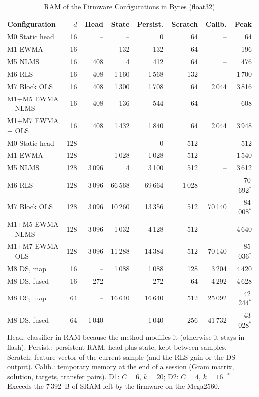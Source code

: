 \begin{table}[t]
\caption{RAM of the Firmware Configurations in Bytes (float32)}
\label{tab:ram}\centering\scriptsize\setlength{\tabcolsep}{2pt}
\begin{tabular}{l r r r r r r r}\toprule
Configuration & $d$ & Head & State & Persist. & Scratch & Calib. & Peak\\\midrule
M0 Static head & 16 & -- & -- & 0 & 64 & -- & 64\\
M1 EWMA & 16 & -- & 132 & 132 & 64 & -- & 196\\
M5 NLMS & 16 & 408 & 4 & 412 & 64 & -- & 476\\
M6 RLS & 16 & 408 & 1\,160 & 1\,568 & 132 & -- & 1\,700\\
M7 Block OLS & 16 & 408 & 1\,300 & 1\,708 & 64 & 2\,044 & 3\,816\\
M1+M5 EWMA + NLMS & 16 & 408 & 136 & 544 & 64 & -- & 608\\
M1+M7 EWMA + OLS & 16 & 408 & 1\,432 & 1\,840 & 64 & 2\,044 & 3\,948\\
M0 Static head & 128 & -- & -- & 0 & 512 & -- & 512\\
M1 EWMA & 128 & -- & 1\,028 & 1\,028 & 512 & -- & 1\,540\\
M5 NLMS & 128 & 3\,096 & 4 & 3\,100 & 512 & -- & 3\,612\\
M6 RLS & 128 & 3\,096 & 66\,568 & 69\,664 & 1\,028 & -- & 70\,692$^*$\\
M7 Block OLS & 128 & 3\,096 & 10\,260 & 13\,356 & 512 & 70\,140 & 84\,008$^*$\\
M1+M5 EWMA + NLMS & 128 & 3\,096 & 1\,032 & 4\,128 & 512 & -- & 4\,640\\
M1+M7 EWMA + OLS & 128 & 3\,096 & 11\,288 & 14\,384 & 512 & 70\,140 & 85\,036$^*$\\
\midrule
M8 DS, map & 16 & -- & 1\,088 & 1\,088 & 128 & 3\,204 & 4\,420\\
M8 DS, fused & 16 & 272 & -- & 272 & 64 & 4\,292 & 4\,628\\
M8 DS, map & 64 & -- & 16\,640 & 16\,640 & 512 & 25\,092 & 42\,244$^*$\\
M8 DS, fused & 64 & 1\,040 & -- & 1\,040 & 256 & 41\,732 & 43\,028$^*$\\
\bottomrule
\multicolumn{8}{p{0.97\columnwidth}}{\scriptsize Head: classifier in RAM because the method modifies it (otherwise it stays in flash). Persist.: persistent RAM, head plus state, kept between samples. Scratch: feature vector of the current sample (and the RLS gain or the DS output). Calib.: temporary memory at the end of a session (Gram matrix, solution, targets, transfer pairs). D1: $C=6$, $k=20$; D2: $C=4$, $k=16$. $^*$Exceeds the 7\,392~B of SRAM left by the firmware on the Mega2560.}
\end{tabular}
\end{table}

